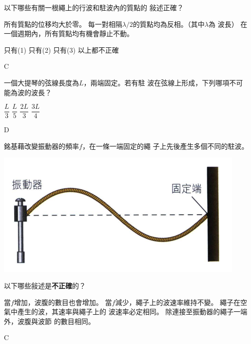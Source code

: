 {
    以下哪些有關一根繩上的行波和駐波內的質點的 敍述正確？
    \begin{statements}
        \task 所有質點的位移均大於零。
        \task 每一對相隔$\lambda/2$的質點均為反相。（其中$\lambda$為 波長）
        \task 在一個週期內，所有質點均有機會靜止不動。
    \end{statements}
    \begin{tasks}
        \task 只有(1)
        \task 只有(2)
        \task 只有(3)
        \task 以上都不正確
    \end{tasks}
}{\mckey C}

{
    一個大提琴的弦線長度為$L$，兩端固定。若有駐 波在弦線上形成，下列哪項不可能為波的波長？
    \begin{tasks}
        \task $\dfrac{L}{3}$
        \task $\dfrac{L}{5}$
        \task $\dfrac{2L}{3}$
        \task $\dfrac{3L}{4}$
    \end{tasks}

}{
    \mckey D
}

{
    銘基藉改變振動器的頻率$f$，在一條一端固定的繩 子上先後產生多個不同的駐波。
    \par{\par\centering\includegraphics[width=.35\textwidth]{./img/ch3_earlyclass_wave_mc_2024-05-14-12-09-36.png}\par}
    以下哪些敍述是\textbf{不正確}的？
    \begin{tasks}
        \task 當$f$增加，波腹的數目也會增加。
        \task 當$f$減少，繩子上的波速率維持不變。
        \task 繩子在空氣中產生的波，其速率與繩子上的 波速率必定相同。
        \task 除連接至振動器的繩子一端外，波腹與波節 的數目相同。
    \end{tasks}

}{\mckey C}

